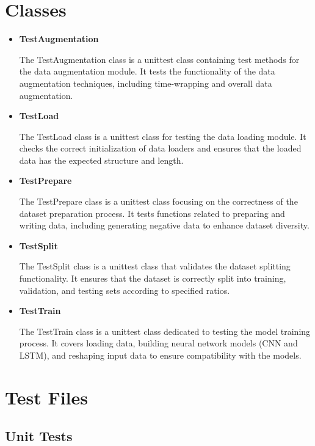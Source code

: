 	\section{Classes}
	
		\begin{itemize}
		
		\item \textbf{TestAugmentation}
		
		The TestAugmentation class is a unittest class containing test methods for the data augmentation module. It tests the functionality of the data augmentation techniques, including time-wrapping and overall data augmentation.
		
		\item \textbf{TestLoad}
		
		The TestLoad class is a unittest class for testing the data loading module. It checks the correct initialization of data loaders and ensures that the loaded data has the expected structure and length.
		
		\item \textbf{TestPrepare}
		
		The TestPrepare class is a unittest class focusing on the correctness of the dataset preparation process. It tests functions related to preparing and writing data, including generating negative data to enhance dataset diversity.
		
		\item \textbf{TestSplit}
		
		The TestSplit class is a unittest class that validates the dataset splitting functionality. It ensures that the dataset is correctly split into training, validation, and testing sets according to specified ratios.
		
		\item \textbf{TestTrain}
		
		The TestTrain class is a unittest class dedicated to testing the model training process. It covers loading data, building neural network models (CNN and LSTM), and reshaping input data to ensure compatibility with the models.
		
		\end{itemize}
	
	\section{Test Files}
		
			\subsection{Unit Tests}
		
